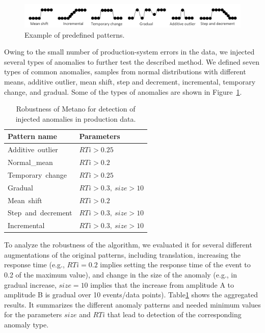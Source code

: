 \begin{figure}[!t]
\centerline{\includegraphics[width=1.0\textwidth]{gfx/chap5/patterns.pdf}}
\caption{Example of predefined patterns.}
\label{figpredefinedpatterns}
\end{figure}

Owing to the small number of production-system errors in the data, we injected several types of anomalies to further test the described method. We defined seven types of common anomalies, samples from normal distributions with different means, additive outlier, mean shift, step and decrement, incremental, temporary change, and gradual. Some of the types of anomalies are shown in Figure~\ref{figpredefinedpatterns}.

\begin{table}[htbp]
\centering
\caption{Robustness of Metano for detection of injected anomalies in production data.}
\begin{tabular}{ll}
\hline
Pattern name             &Parameters  \\ \hline
Additive\ outlier        &$RTi>0.25$   \\

Normal\_mean                          &$RTi>0.2$         \\

Temporary\ change                      &$RTi>0.25$          \\ 

Gradual                       &$RTi>0.3,\ size>10$\\ 

Mean\ shift                         &$RTi>0.2$\\

Step\ and\ decrement                      &$RTi>0.3,\ size>10$\\

Incremental                        &$RTi>0.3,\ size>10$ \\

\hline
\end{tabular}\label{tablevaeres}
\end{table}

To analyze the robustness of the algorithm, we evaluated it for several different augmentations of the original patterns, including translation, increasing the response time (e.g., $RTi=0.2$ implies setting the response time of the event to 0.2 of the maximum value), and change in the size of the anomaly (e.g., in gradual increase, $size=10$ implies that the increase from amplitude A to amplitude B is gradual over 10 events/data points). Table\ref{tablevaeres} shows the aggregated results. It summarizes the different anomaly patterns and needed minimum values for the parameters $size$ and $RTi$ that lead to detection of the corresponding anomaly type. 

